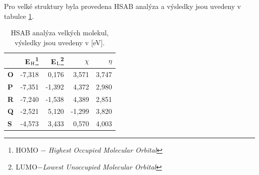 \documentclass[
digital, %
table,   %
lof,     %
lot,     %
oneside,
]{fithesis3}
\begin{document}
 Pro velké struktury byla provedena HSAB analýza a výsledky jsou uvedeny v tabulce \ref{hsab_large}.
\begin{table}[htbp]
\begin{minipage}{\textwidth}
\caption{HSAB analýza velkých molekul, výsledky jsou uvedeny v [eV].}
\begin{center}
\begin{tabular}{|l|r|r|r|r|}
\hline
\label{hsab_large} & E$_{\ce{H}}$\footnote{HOMO $-$ \textit{Highest Occupied Molecular Orbital}}  & E$_{\ce{L}}$\footnote{LUMO$ - $\textit{Lowest Unoccupied Molecular Orbital}} & $\chi$  & $\eta$  \\ \hline
\textbf{O} & -7,318 & 0,176 & 3,571 & 3,747 \\ \hline
\textbf{P} & -7,351 & -1,392 & 4,372 & 2,980 \\ \hline
\textbf{R} & -7,240 & -1,538 & 4,389 & 2,851 \\ \hline
\textbf{Q} & -2,521 & 5,120 & -1,299 & 3,820 \\ \hline
\textbf{S} & -4,573 & 3,433 & 0,570 & 4,003 \\ \hline
\end{tabular}
\end{center}
\end{minipage}
\end{table}
\end{document}
